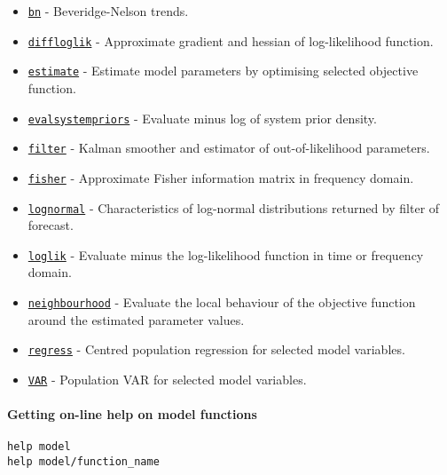 \begin{itemize}
\itemsep1pt\parskip0pt
\item
  \href{model/bn}{\texttt{bn}} - Beveridge-Nelson trends.
\item
  \href{model/diffloglik}{\texttt{diffloglik}} - Approximate gradient
  and hessian of log-likelihood function.
\item
  \href{model/estimate}{\texttt{estimate}} - Estimate model parameters
  by optimising selected objective function.
\item
  \href{model/evalsystempriors}{\texttt{evalsystempriors}} - Evaluate
  minus log of system prior density.
\item
  \href{model/filter}{\texttt{filter}} - Kalman smoother and estimator
  of out-of-likelihood parameters.
\item
  \href{model/fisher}{\texttt{fisher}} - Approximate Fisher information
  matrix in frequency domain.
\item
  \href{model/lognormal}{\texttt{lognormal}} - Characteristics of
  log-normal distributions returned by filter of forecast.
\item
  \href{model/loglik}{\texttt{loglik}} - Evaluate minus the
  log-likelihood function in time or frequency domain.
\item
  \href{model/neighbourhood}{\texttt{neighbourhood}} - Evaluate the
  local behaviour of the objective function around the estimated
  parameter values.
\item
  \href{model/regress}{\texttt{regress}} - Centred population regression
  for selected model variables.
\item
  \href{model/VAR}{\texttt{VAR}} - Population VAR for selected model
  variables.
\end{itemize}

\paragraph{Getting on-line help on model
functions}

\begin{verbatim}
help model
help model/function_name
\end{verbatim}




